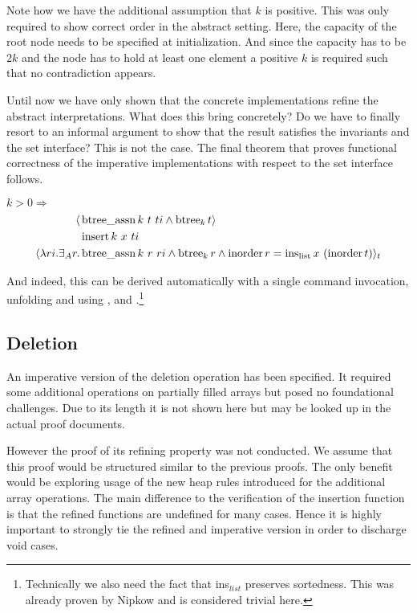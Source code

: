 Note how we have the additional assumption that $k$ is positive.
This was only required to show correct order in the abstract setting.
Here, the capacity of the root node needs to be specified at initialization.
And since the capacity has to be $2k$ and the node has to hold at least one element
a positive $k$ is required such that no contradiction appears.

Until now we have only shown that the concrete
implementations refine the abstract interpretations.
What does this bring concretely?
Do we have to finally resort to an informal argument to show that the result
satisfies the invariants and the set interface?
This is not the case.
The final theorem that proves functional correctness of the imperative
implementations with respect to the set interface follows.

\begin{corollary} $k > 0 \Longrightarrow$
\begin{align*}
   \langle &\operatorname{btree\_assn} k\ t\ ti \wedge \operatorname{btree}_k t \rangle \\
           &\operatorname{insert} k\ x\ ti \\
   \langle \lambda ri. \exists_A r. &\operatorname{btree\_assn} k\ r\ ri \wedge \operatorname{btree}_k r \wedge \operatorname{inorder} r = \operatorname{ins_{list}} x\ (\operatorname{inorder} t)\rangle_t
\end{align*}
\end{corollary}

And indeed, this can be derived automatically with a single command invocation,
unfolding  and using ,  and .\footnote{
    Technically we also need the fact that ins$_{list}$ preserves sortedness.
    This was already proven by Nipkow \parencite{DBLP:conf/itp/Nipkow16}
    and is considered trivial here.
}


\subsection{Deletion}

An imperative version of the deletion operation has been specified.
It required some additional operations on partially filled arrays but
posed no foundational challenges.
Due to its length it is not shown here but may be looked up in the
actual proof documents.

However the proof of its refining property was not conducted.
We assume that this proof would be structured similar to
the previous proofs.
The only benefit would be exploring usage of the new
heap rules introduced for the additional array operations.
The main difference to the verification of the
insertion function is that the refined functions
are undefined for many cases.
Hence it is highly important
to strongly tie the refined and imperative version
in order to discharge void cases.